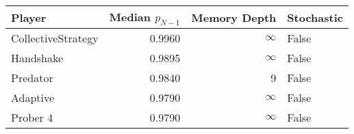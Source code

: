 \begin{tabular}{lrrl}
\toprule
             Player &  Median $p_{N-1}$ &  Memory Depth & Stochastic \\
\midrule
 CollectiveStrategy &            0.9960 &            \(\infty\) &      False \\
          Handshake &            0.9895 &            \(\infty\) &      False \\
           Predator &            0.9840 &             9 &      False \\
           Adaptive &            0.9790 &            \(\infty\) &      False \\
           Prober 4 &            0.9790 &            \(\infty\) &      False \\
\bottomrule
\end{tabular}
